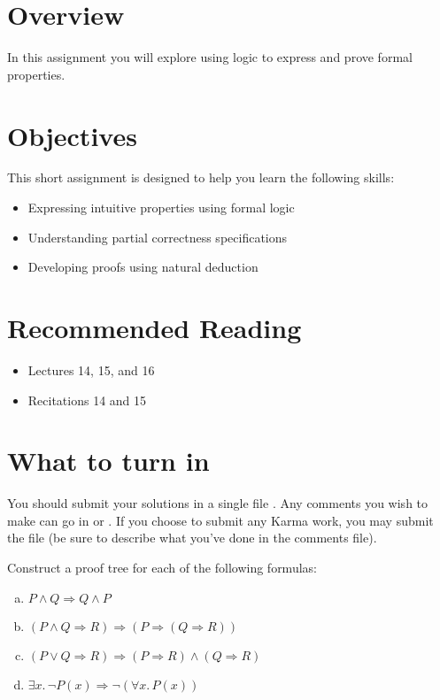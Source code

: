 \documentclass{pset}
\date{Thursday, April 17}
\begin{document}
\maketitle{}

\section*{Overview}

In this assignment you will explore using logic to express and prove
formal properties.

\section*{Objectives}

This short assignment is designed to help you learn the following
skills:
\begin{itemize}
\item Expressing intuitive properties using formal logic
\item Understanding partial correctness specifications
\item Developing proofs using natural deduction
\end{itemize}

\section*{Recommended Reading}

\begin{itemize}
\item Lectures 14, 15, and 16
\item Recitations 14 and 15
\end{itemize}

\section*{What to turn in}
You should submit your solutions in a single file
. Any comments you wish to make can go in
 or . If you choose to
submit any Karma work, you may submit the file 
(be sure to describe what you've done in the comments file).

\newpage{}

\exercise{}

Construct a proof tree for each of the following formulas:

\begin{enumerate}[(a)]
\item $P \wedge Q \Longrightarrow Q \wedge P$
\item $(P \wedge Q \Longrightarrow R) \Longrightarrow (P \Longrightarrow (Q \Longrightarrow R))$
\item $(P \vee Q \Longrightarrow R) \Longrightarrow (P \Longrightarrow R) \wedge (Q \Longrightarrow R)$
\item $\exists x.\, \neg P(x) \Longrightarrow \neg(\forall x.\, P(x))$
\end{enumerate}
\end{document}
